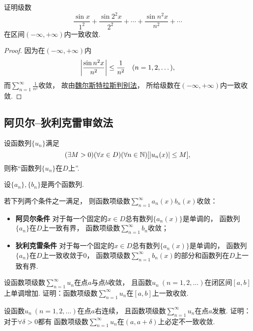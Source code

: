 \begin{example}
证明级数\[
	\frac{\sin x}{1^2}
	+ \frac{\sin 2^2 x}{2^2}
	+ \dotsb
	+ \frac{\sin n^2 x}{n^2}
	+ \dotsb
\]在区间\((-\infty,+\infty)\)内一致收敛.
\begin{proof}
因为在\((-\infty,+\infty)\)内\[
	\abs{\frac{\sin n^2 x}{n^2}} \leq \frac{1}{n^2}
	\quad(n=1,2,\dotsc),
\]
而\(\sum_{n=1}^\infty \frac{1}{n^2}\)收敛，
故由\hyperref[theorem:无穷级数.魏尔斯特拉斯判别法]{魏尔斯特拉斯判别法}，
所给级数在\((-\infty,+\infty)\)内一致收敛.
\end{proof}
\end{example}

\subsection{阿贝尔--狄利克雷审敛法}
\begin{definition}\label{definition:函数项级数.函数列的一致有界性}
设函数列\(\{u_n\}\)满足\[
	(\exists M>0)
	(\forall x \in D)
	(\forall n\in\mathbb{N})
	[\abs{u_n(x)} \leq M],
\]
则称“函数列\(\{u_n\}\)在\(D\)上”.
\end{definition}

\begin{theorem}\label{theorem:函数项级数.函数项级数的阿贝尔--狄利克雷审敛法}
设\(\{a_n\},\{b_n\}\)是两个函数列.

若下列两个条件之一满足，
则函数项级数\(\sum_{n=1}^\infty a_n(x) b_n(x)\)收敛：\begin{itemize}
	\item {\rm\bf 阿贝尔条件}
	对于每一个固定的\(x \in D\)总有数列\(\{a_n(x)\}\)是单调的，
	函数列\(\{a_n\}\)在\(D\)上一致有界，
	函数项级数\(\sum_{n=1}^\infty b_n\)收敛；

	\item {\rm\bf 狄利克雷条件}
	对于每一个固定的\(x \in D\)总有数列\(\{a_n(x)\}\)是单调的，
	函数列\(\{a_n\}\)在\(D\)上一致收敛于\(0\)，
	函数项级数\(\sum_{n=1}^\infty b_n(x)\)的部分和函数列在\(D\)上一致有界.
\end{itemize}
\end{theorem}

\begin{example}
设函数项级数\(\sum_{n=1}^\infty u_n\)在点\(a\)与点\(b\)收敛，
且函数\(u_n\ (n=1,2,\dotsc)\)在闭区间\([a,b]\)上单调增加.
证明：函数项级数\(\sum_{n=1}^\infty u_n\)在\([a,b]\)上一致收敛.
\end{example}
\begin{example}
设函数\(u_n\ (n=1,2,\dotsc)\)在点\(a\)右连续，
且函数项级数\(\sum_{n=1}^\infty u_n\)在点\(a\)发散.
证明：对于\(\forall\delta>0\)都有
函数项级数\(\sum_{n=1}^\infty u_n\)在\((a,a+\delta)\)上必定不一致收敛.
\end{example}

